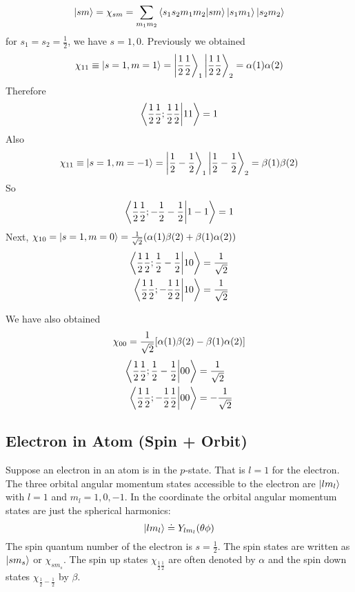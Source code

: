 \begin{equation}
\ket{s m} = \chi_{s m} = \sum_{m_1 m_2} \braket{s_1 s_2 m_1 m_2}{s m} \ket{s_1 m_1} \ket{s_2 m_2}
\end{equation}
for $s_1 = s_2 = \frac{1}{2}$, we have $s=1,0$. Previously we obtained
\begin{equation}
\chi_{11} \equiv \ket{s=1,m=1} = \ket{\frac{1}{2}\frac{1}{2}}_1 \ket{\frac{1}{2}\frac{1}{2}}_2 = \alpha(1)\alpha(2)
\end{equation}
Therefore
\begin{equation}
\braket{\frac{1}{2}\frac{1}{2};\frac{1}{2}\frac{1}{2}}{1 1} = 1
\end{equation}
Also 
\begin{equation}
\chi_{11} \equiv \ket{s=1,m=-1} = \ket{\frac{1}{2}-\frac{1}{2}}_1 \ket{\frac{1}{2}-\frac{1}{2}}_2 = \beta(1)\beta(2)
\end{equation}
So
\begin{equation}
\braket{\frac{1}{2}\frac{1}{2};-\frac{1}{2}-\frac{1}{2}}{1 -1} = 1
\end{equation}
Next, $\chi_{1 0} = \ket{s=1, m=0} = \frac{1}{\sqrt{2}} \qty(\alpha(1)\beta(2) + \beta(1)\alpha(2))$
\begin{align*}
\braket{\frac{1}{2}\frac{1}{2};\frac{1}{2}-\frac{1}{2}}{1 0} &= \frac{1}{\sqrt{2}} \\
\braket{\frac{1}{2}\frac{1}{2};-\frac{1}{2}\frac{1}{2}}{1 0} &= \frac{1}{\sqrt{2}} 
\end{align*}

We have also obtained
\begin{equation}
\chi_{0 0} = \frac{1}{\sqrt{2}} \qty[\alpha(1)\beta(2) - \beta(1)\alpha(2)]
\end{equation}
\begin{align*}
\braket{\frac{1}{2}\frac{1}{2};\frac{1}{2}-\frac{1}{2}}{0 0} &= \frac{1}{\sqrt{2}} \\
\braket{\frac{1}{2}\frac{1}{2};-\frac{1}{2}\frac{1}{2}}{0 0} &= -\frac{1}{\sqrt{2}} 
\end{align*}






\subsection{Electron in Atom (Spin + Orbit)}
Suppose an electron in an atom is in the $p$-state. That is $l=1$ for the electron. The three orbital angular momentum states accessible to the electron are $\ket{l m_l}$ with $l=1$ and $m_l = 1,0,-1$. In the coordinate the orbital angular momentum states are just the spherical harmonics:
\begin{equation}
\ket{l m_l} \doteq Y_{l m_l}\qty(\theta\phi)
\end{equation}
The spin quantum number of the electron is $s=\frac{1}{2}$. The spin states are written as $\ket{s m_s}$ or $\chi_{s m_s}$. The spin up states $\chi_{\frac{1}{2}\frac{1}{2}}$ are often denoted by $\alpha$ and the spin down states  $\chi_{\frac{1}{2}-\frac{1}{2}}$ by $\beta$.

